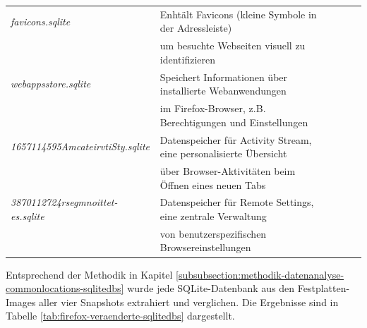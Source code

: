 \begin{appendices}
\begin{table}[h!]
{\begin{tabular}{|l|l|lll}
\textit{favicons.sqlite}                  & Enhtält Favicons (kleine Symbole in der Adressleiste)\\&um besuchte Webseiten visuell zu identifizieren                   &  &  &  \\ \cline{1-2}
\textit{webappsstore.sqlite}              & Speichert Informationen über installierte Webanwendungen\\&im Firefox-Browser, z.B. Berechtigungen und Einstellungen      &  &  &  \\ \cline{1-2}
\textit{1657114595AmcateirvtiSty.sqlite}  & Datenspeicher für Activity Stream, eine personalisierte Übersicht\\&über Browser-Aktivitäten beim Öffnen eines neuen Tabs &  &  &  \\ \cline{1-2}
\textit{3870112724rsegmnoittet-es.sqlite} & Datenspeicher für Remote Settings, eine zentrale Verwaltung\\&von benutzerspezifischen Browsereinstellungen               &  &  &  \\ \cline{1-2}
\end{tabular}
}
\end{table}

Entsprechend der Methodik in Kapitel \ref{subsubsection:methodik-datenanalyse-commonlocations-sqlitedbs} wurde jede SQLite-Datenbank aus den Festplatten-Images aller vier Snapshots extrahiert und verglichen.
Die Ergebnisse sind in Tabelle \ref{tab:firefox-veraenderte-sqlitedbs} dargestellt.


\end{appendices}
